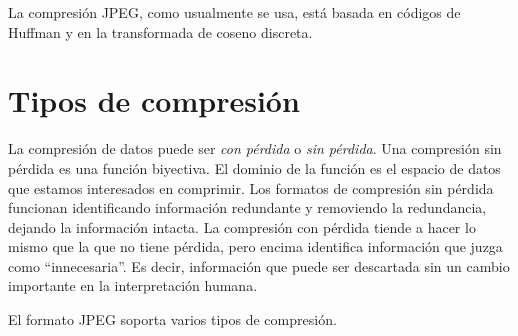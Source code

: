 La compresión JPEG, como usualmente se usa, está basada en códigos de Huffman y en
la transformada de coseno discreta.

\section{Tipos de compresión}

La compresión de datos puede ser \emph{con pérdida} o \emph{sin pérdida}. Una
\gls{compresión sin pérdida} es una función biyectiva. El dominio de la función
es el espacio de datos que estamos interesados en comprimir. Los formatos de
compresión sin pérdida funcionan identificando información redundante y
removiendo la redundancia, dejando la información intacta. La compresión con
pérdida tiende a hacer lo mismo que la que no tiene pérdida, pero encima
identifica información que juzga como ``innecesaria''. Es decir, información
que puede ser descartada sin un cambio importante en la interpretación humana.

El formato JPEG soporta varios tipos de compresión.

